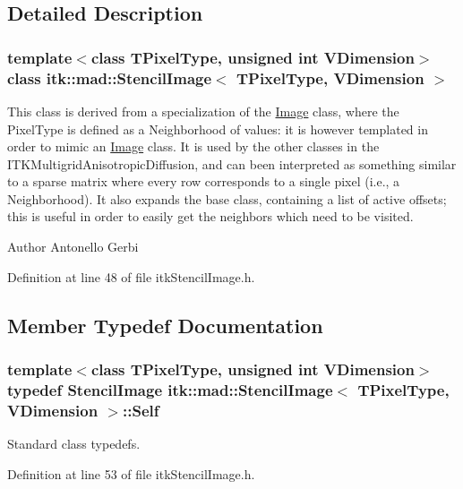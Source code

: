 \subsection{Detailed Description}
\subsubsection*{template$<$class T\-Pixel\-Type, unsigned int V\-Dimension$>$class itk\-::mad\-::\-Stencil\-Image$<$ T\-Pixel\-Type, V\-Dimension $>$}

This class is derived from a specialization of the \hyperlink{class_image}{Image} class, where the Pixel\-Type is defined as a Neighborhood of values\-: it is however templated in order to mimic an \hyperlink{class_image}{Image} class. It is used by the other classes in the I\-T\-K\-Multigrid\-Anisotropic\-Diffusion, and can been interpreted as something similar to a sparse matrix where every row corresponds to a single pixel (i.\-e., a Neighborhood). It also expands the base class, containing a list of active offsets; this is useful in order to easily get the neighbors which need to be visited. 

\begin{DoxyAuthor}{Author}
Antonello Gerbi 
\end{DoxyAuthor}


Definition at line 48 of file itk\-Stencil\-Image.\-h.



\subsection{Member Typedef Documentation}
\hypertarget{classitk_1_1mad_1_1_stencil_image_a3cd288ed59c1431bf14b735b995cf58c}{
\subsubsection[{Self}]{\setlength{\rightskip}{0pt plus 5cm}template$<$class T\-Pixel\-Type, unsigned int V\-Dimension$>$ typedef {\bf Stencil\-Image} {\bf itk\-::mad\-::\-Stencil\-Image}$<$ T\-Pixel\-Type, V\-Dimension $>$\-::{\bf Self}}}\label{classitk_1_1mad_1_1_stencil_image_a3cd288ed59c1431bf14b735b995cf58c}
Standard class typedefs. 

Definition at line 53 of file itk\-Stencil\-Image.\-h.



